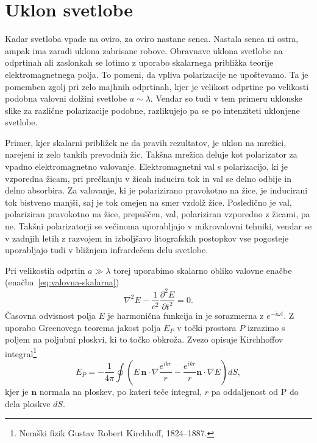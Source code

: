 \section{Uklon svetlobe}
Kadar svetloba vpade na oviro, za oviro nastane senca. Nastala senca ni ostra, ampak
ima zaradi uklona zabrisane robove. Obravnave 
uklona svetlobe na odprtinah ali zaslonkah se lotimo z uporabo
skalarnega približka teorije elektromagnetnega polja. To pomeni, da vpliva 
polarizacije ne upoštevamo. Ta je pomemben zgolj pri zelo majhnih odprtinah, 
kjer je velikost odprtine po velikosti podobna valovni dolžini svetlobe $a \sim \lambda$. 
Vendar so tudi v tem primeru uklonske slike za različne polarizacije podobne, 
razlikujejo pa se po intenziteti uklonjene svetlobe.

\begin{remark}
Primer, kjer skalarni približek ne da pravih rezultatov, je uklon na mrežici, narejeni 
iz zelo tankih prevodnih žic. Takšna mrežica deluje kot polarizator za vpadno elektromagnetno valovanje.
Elektromagnetni val s polarizacijo, ki je vzporedna žicam, pri prečkanju v žicah inducira tok
in val se delno odbije in delno absorbira. Za valovanje, ki je polarizirano pravokotno 
na žice, je  inducirani tok bistveno manjši, saj je tok omejen na smer
vzdolž žice. Posledično je val, polariziran pravokotno na žice, prepuščen, 
val, polariziran vzporedno z žicami, pa ne. 
Takšni polarizatorji se večinoma uporabljajo v mikrovalovni tehniki, 
vendar se v zadnjih letih z razvojem in izboljšavo litografskih postopkov
vse pogosteje uporabljajo tudi v bližnjem infrardečem delu svetlobe.
\end{remark}

Pri velikostih odprtin $a\gg\lambda$ torej uporabimo skalarno obliko valovne enačbe 
(enačba~\ref{eq:valovna-skalarna})
\begin{equation}
\nabla^2 E - \frac{1}{c^2}\frac{\partial^2 E}{\partial t^2} = 0.
\label{eq:skalarna-valovna-enačba}
\end{equation}
Časovna odvisnost polja $E$ je harmonična funkcija in 
je sorazmerna z $e^{-i \omega t}$. Z uporabo Greenovega teorema  
jakost polja $E_P$ v točki prostora $P$ izrazimo s poljem na 
poljubni ploskvi, ki to točko obkroža. 
Zvezo opisuje Kirchhoffov integral\footnote{Nemški fizik Gustav Robert Kirchhoff, 1824--1887.} 
\begin{equation}
E_P = -\frac{1}{4\pi}\oint \left(E\,\mathbf{n}\cdot \nabla \frac{e^{ikr}}{r}-
\frac{e^{ikr}}{r}\mathbf{n}\cdot \nabla E \right) dS,
\label{eq:Kirchhoffov-integral}
\end{equation}
kjer je $\mathbf{n}$ normala na ploskev, po kateri teče integral, $r$ pa oddaljenost od P
do dela ploskve $dS$. 

